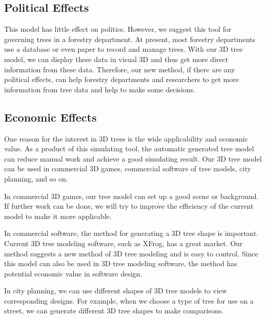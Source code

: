 \subsection{Political Effects}

This model has little effect on politics. However, we suggest this tool for governing trees in a forestry department. At present, most forestry departments use a database or even paper to record and manage trees. With our 3D tree model, we can display these data in visual 3D and thus get more direct information from these data. Therefore, our new method, if there are any political effects, can help forestry departments and researchers to get more information from tree data and help to make some decisions. 

\subsection{Economic Effects}

One reason for the interest in 3D trees is the wide applicability and economic value. As a product of this simulating tool, the automatic generated tree model can reduce manual work and achieve a good simulating result. Our 3D tree model can be used in commercial 3D games, commercial software of tree models, city planning, and so on. 

In commercial 3D games, our tree model can set up a good scene or background. If further work can be done, we will try to improve the efficiency of the current model to make it more applicable.

In commercial software, the method for generating a 3D tree shape is important. Current 3D tree modeling software, such as XFrog, has a great market. Our method suggests a new method of 3D tree modeling and is easy to control. Since this model can also be used in 3D tree modeling software, the method has potential economic value in software design.

In city planning, we can use different shapes of 3D tree models to view corresponding designs. For example, when we choose a type of tree for use on a street, we can generate different 3D tree shapes to make comparisons.